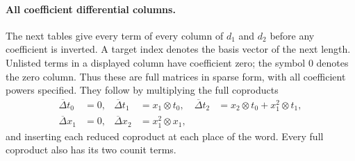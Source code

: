 \paragraph{All coefficient differential columns.}
The next tables give every term of every column of $d_1$ and
$d_2$ before any coefficient is inverted. A target index denotes
the basis vector of the next length. Unlisted terms in a displayed
column have coefficient zero; the symbol $0$ denotes the zero column.
Thus these are full matrices in sparse form, with all coefficient
powers specified. They follow by multiplying the full coproducts
\[
\begin{aligned}
\overline\Delta t_0&=0,&
\overline\Delta t_1&=x_1\otimes t_0,&
\overline\Delta t_2&=x_2\otimes t_0+x_1^2\otimes t_1,\\
\overline\Delta x_1&=0,&
\overline\Delta x_2&=x_1^2\otimes x_1,
\end{aligned}
\]
and inserting each reduced coproduct at each place of the word.
Every full coproduct also has its two counit terms.

